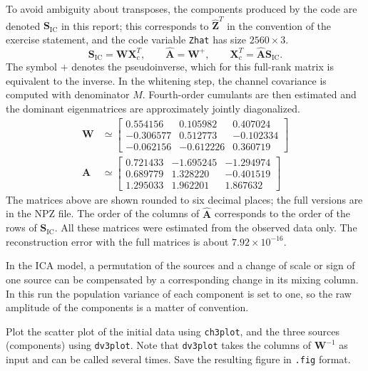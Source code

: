 To avoid ambiguity about transposes, the components produced by the code are denoted $\mathbf{S}_{\mathrm{IC}}$ in this report; this corresponds to $\hat{\mathbf{Z}}^{T}$ in the convention of the exercise statement, and the code variable \texttt{Zhat} has size $2560\times3$.
\begin{equation}
\mathbf{S}_{\mathrm{IC}}=\mathbf{W}\mathbf{X}_c^{T},\qquad
\widehat{\mathbf{A}}=\mathbf{W}^{+},\qquad
\mathbf{X}_c^{T}=\widehat{\mathbf{A}}\mathbf{S}_{\mathrm{IC}} .
\label{eq:ica}
\end{equation}
The symbol $+$ denotes the pseudoinverse, which for this full-rank matrix is equivalent to the inverse. In the whitening step, the channel covariance is computed with denominator $M$. Fourth-order cumulants are then estimated and the dominant eigenmatrices are approximately jointly diagonalized.
\begin{align}
\mathbf{W}&\simeq
\begin{bmatrix}
 0.554156 &  0.105982 &  0.407024\\
-0.306577 &  0.512773 & -0.102334\\
-0.062156 & -0.612226 &  0.360719
\end{bmatrix}
\label{eq:W}\\[4pt]
\widehat{\mathbf{A}}&\simeq
\begin{bmatrix}
0.721433 & -1.695245 & -1.294974\\
0.689779 &  1.328220 & -0.401519\\
1.295033 &  1.962201 &  1.867632
\end{bmatrix}
\label{eq:Ahat}
\end{align}
The matrices above are shown rounded to six decimal places; the full versions are in the NPZ file. The order of the columns of $\widehat{\mathbf{A}}$ corresponds to the order of the rows of $\mathbf{S}_{\mathrm{IC}}$. All these matrices were estimated from the observed data only. The reconstruction error with the full matrices is about $7.92\times10^{-16}$.

In the ICA model, a permutation of the sources and a change of scale or sign of one source can be compensated by a corresponding change in its mixing column. In this run the population variance of each component is set to one, so the raw amplitude of the components is a matter of convention.


\begin{taskbox}
Plot the scatter plot of the initial data using \texttt{ch3plot}, and the three sources (components) using \texttt{dv3plot}. Note that \texttt{dv3plot} takes the columns of $\mathbf{W}^{-1}$ as input and can be called several times. Save the resulting figure in \texttt{.fig} format.
\end{taskbox}

